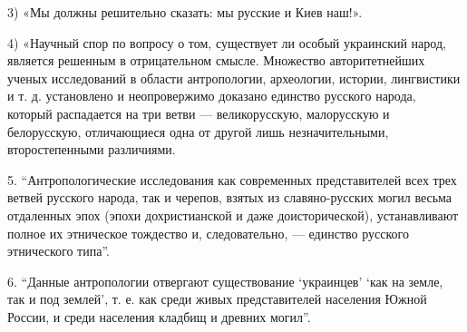 3) «Мы должны решительно сказать: мы русские и Киев наш!».

4) «Научный спор по вопросу о том, существует ли особый украинский народ,
является решенным в отрицательном смысле. Множество авторитетнейших ученых
исследований в области антропологии, археологии, истории, лингвистики и т. д.
установлено и неопровержимо доказано единство русского народа, который
распадается на три ветви — великорусскую, малорусскую и белорусскую,
отличающиеся одна от другой лишь незначительными, второстепенными различиями.

5. \enquote{Антропологические исследования как современных представителей всех трех
ветвей русского народа, так и черепов, взятых из славяно-русских могил весьма
отдаленных эпох (эпохи дохристианской и даже доисторической), устанавливают
полное их этническое тождество и, следовательно, — единство русского
этнического типа}.

6. \enquote{Данные антропологии отвергают существование \enquote{украинцев} 
\enquote{как на земле, так
и под землей}, т. е. как среди живых представителей населения Южной России, и
среди населения кладбищ и древних могил}.

